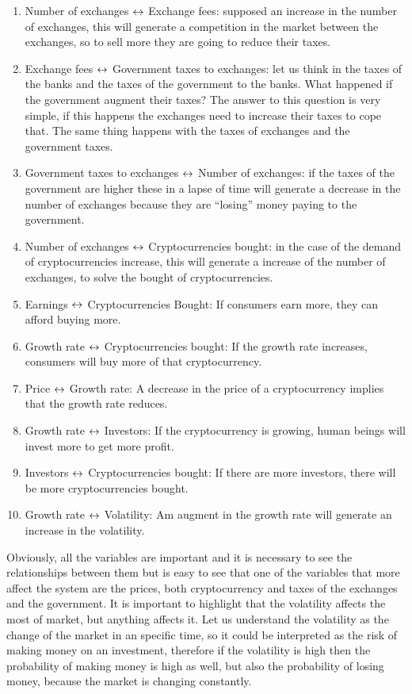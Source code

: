 \begin{enumerate}
  \item Number of exchanges $\leftrightarrow$ Exchange fees: supposed an increase in the number of exchanges, this will generate a competition in the market between the exchanges, so to sell more they are going to reduce their taxes.
  \item Exchange fees $\leftrightarrow$ Government taxes to exchanges: let us think in the taxes of the banks and the taxes of the government to the banks. What happened if the government augment their taxes? The answer to this question is very simple, if this happens the exchanges need to increase their taxes to cope that. The same thing happens with the taxes of exchanges and the government taxes. 
  \item Government taxes to exchanges $\leftrightarrow$ Number of exchanges: if the taxes of the government are higher these in a lapse of time will generate a decrease in the number of exchanges because they are ``losing'' money paying to the government. 
  \item Number of exchanges $\leftrightarrow$ Cryptocurrencies bought: in the case of the demand of  cryptocurrencies increase, this will generate a increase of the number of exchanges, to solve the bought of cryptocurrencies.
  \item Earnings $\leftrightarrow$ Cryptocurrencies Bought: If consumers earn more, they can afford buying more.
  \item Growth rate $\leftrightarrow$ Cryptocurrencies bought: If the growth rate increases, consumers will buy more of that cryptocurrency.
  \item Price $\leftrightarrow$ Growth rate: A decrease in the price of a cryptocurrency implies that the growth rate reduces.
  \item Growth rate $\leftrightarrow$ Investors: If the cryptocurrency is growing, human beings will invest more to get more profit.
  \item Investors $\leftrightarrow$ Cryptocurrencies bought: If there are more investors, there will be more cryptocurrencies bought.
  \item Growth rate $\leftrightarrow$ Volatility: Am augment in the growth rate will generate an increase in the volatility.
\end{enumerate}
Obviously, all the variables are important and it is necessary to see the relationships between them but is easy to see that one of the variables that more affect the system are the prices, both cryptocurrency and taxes of the exchanges and the government. It is important to highlight that the volatility affects the most of market, but anything affects it. Let us understand the volatility as the change of the market in an specific time, so it could be interpreted as the risk of making money on an investment, therefore if the volatility is  high then the probability of making money is high as well, but also the probability of losing money, because the market is changing constantly.
